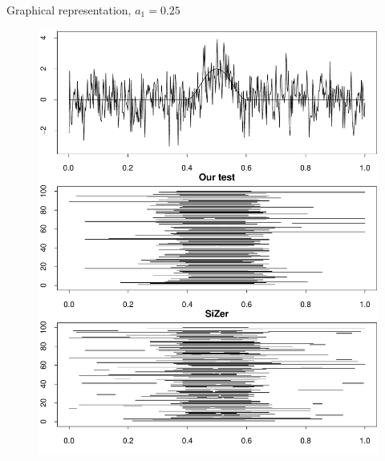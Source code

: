 \documentclass[10pt]{beamer}
\begin{document}
\begin{frame}{Graphical representation, $a_1 = 0.25$}
  \begin{figure}
    \centering
    \includegraphics[height=0.85\textheight]{min_int_with_T_500_a1_25.pdf}
    \label{figure:comparison_results_1}
  \end{figure}
\end{frame}
\end{document}
